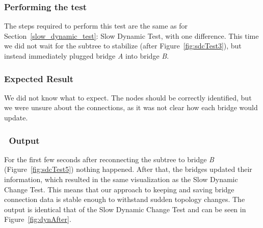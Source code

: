 \subsubsection*{Performing the test}
The steps required to perform this test are the same as for Section~\ref{slow_dynamic_test}: Slow Dynamic Test, with one difference.
This time we did not wait for the subtree to stabilize (after Figure~\ref{fig:sdcTest3}), but instead immediately plugged bridge \textit{A} into bridge \textit{B}.

\subsubsection*{Expected Result}
We did not know what to expect.
The nodes should be correctly identified, but we were unsure about the connections, as it was not clear how each bridge would update.

\subsubsection*{\tool\ Output}
For the first few seconds after reconnecting the subtree to bridge \textit{B} (Figure~\ref{fig:sdcTest5}) nothing happened.
After that, the bridges updated their information, which resulted in the same visualization as the Slow Dynamic Change Test.
This means that our approach to keeping and saving bridge connection data is stable enough to withstand sudden topology changes.
The output is identical that of the Slow Dynamic Change Test and can be seen in Figure~\ref{fig:dynAfter}.
